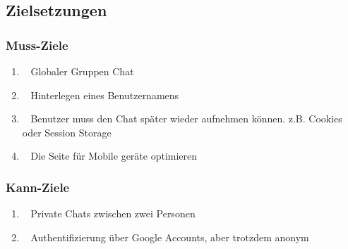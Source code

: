 \documentclass[12pt]{article}
\begin{document}
	\subsection{Zielsetzungen}
	\subsubsection{Muss-Ziele}
	\begin{enumerate}
		\item \faGlobe~   Globaler Gruppen Chat
		\item \faUser~    Hinterlegen eines Benutzernamens
		\item \faKey~     Benutzer muss den Chat später wieder aufnehmen können. z.B. Cookies oder Session Storage
		\item \faMobile~  Die Seite für Mobile geräte optimieren
	\end{enumerate}
	
	\subsubsection{Kann-Ziele}
	\begin{enumerate}
		\item \faUsers~   Private Chats zwischen zwei Personen
		\item \faGoogle~  Authentifizierung über Google Accounts, aber trotzdem anonym
	\end{enumerate}
\end{document}
